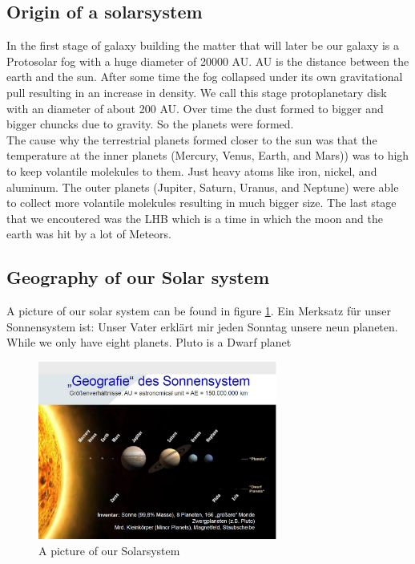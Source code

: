 \subsection{Origin of a solarsystem}
In the first stage of galaxy building the matter that will later be our galaxy is a Protosolar fog with a huge diameter of 20000 \ac{AU}. \ac{AU} is the distance between the earth and the sun. After some time the fog collapsed under its own gravitational pull resulting in an increase in density. We call this stage protoplanetary disk with an diameter of about 200 \ac{AU}. Over time the dust formed to bigger and bigger chuncks due to gravity. So the planets were formed.\\ The cause why the terrestrial planets formed closer to the sun was that the temperature at the inner planets (Mercury, Venus, Earth, and Mars)) was to high to keep volantile molekules to them. Just heavy atoms like iron, nickel, and aluminum. The outer planets (Jupiter, Saturn, Uranus, and Neptune) were able to collect more volantile molekules resulting in much bigger size. The last stage that we encoutered was the \ac{LHB} which is a time in which the moon and the earth was hit by a lot of Meteors.

\subsection{Geography of our Solar system}
A picture of our solar system can be found in figure \ref{fig:Foliensatz1:geography}. Ein Merksatz für unser Sonnensystem ist: Unser Vater erklärt mir jeden Sonntag unsere neun planeten. While we only have eight planets. Pluto is a Dwarf planet
\begin{figure}
    \centering
    \includegraphics[width=0.7\textwidth]{images/Foliensatz1_geography_of_our_solarsystem.png}
    \caption{A picture of our Solarsystem}
    \label{fig:Foliensatz1:geography}
\end{figure}

